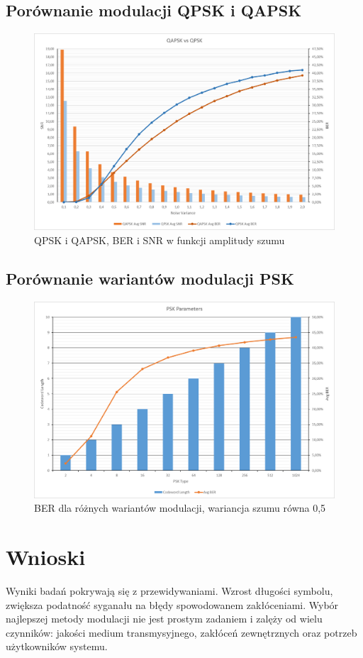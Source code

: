 \documentclass{article}
\begin{document}
	\subsection{Porównanie modulacji QPSK i QAPSK}
		\begin{figure}[H]
			\centering
			\includegraphics[width=0.8\linewidth]{img/chart/qpsk_vs_qapsk.png}
			\caption{QPSK i QAPSK, BER i SNR w funkcji amplitudy szumu}
			\label{fig:qpsk_vs_qapsk}
		\end{figure}

	\subsection{Porównanie wariantów modulacji PSK}
		\begin{figure}[H]
			\centering
			\includegraphics[width=0.8\linewidth]{img/chart/psk_comp.png}
			\caption{BER dla różnych wariantów modulacji, wariancja szumu równa 0,5}
			\label{fig:psk_comp}
		\end{figure}

\newpage
\section{Wnioski}
	Wyniki badań pokrywają się z przewidywaniami. Wzrost długości symbolu, zwiększa podatność syganału na błędy spowodowanem zakłóceniami. Wybór najlepszej metody modulacji nie jest prostym zadaniem i zalęży od wielu czynników: jakości medium transmysyjnego, zakłóceń zewnętrznych oraz potrzeb użytkowników systemu.\\

\newpage
\tableofcontents
\end{document}
